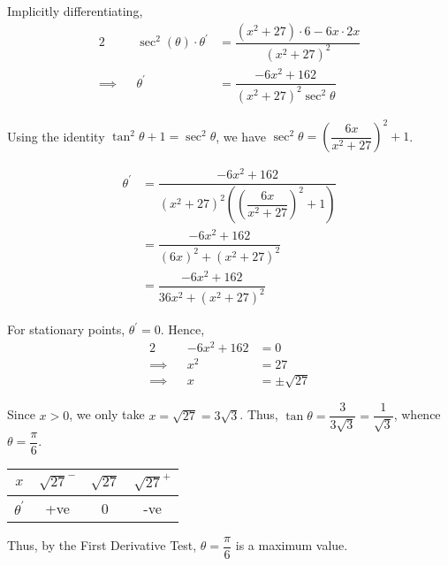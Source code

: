 \documentclass{echw}
\begin{document}
            Implicitly differentiating,
            \begin{alignat*}{2}
                &&\sec^2(\theta)\cdot\theta^\prime &= \dfrac{(x^2+27)\cdot 6 - 6x \cdot 2x}{(x^2+27)^2}\\
                \implies&&\theta^\prime&=\dfrac{-6x^2 + 162}{(x^2+27)^2\sec^2\theta}
            \end{alignat*}

            Using the identity $\tan^2 \theta + 1 = \sec^2\theta$, we have $\sec^2\theta = \left(\dfrac{6x}{x^2+27}\right)^2 + 1$.

            \begin{align*}
                \theta^\prime &= \dfrac{-6x^2 + 162}{(x^2+27)^2\left(\left(\dfrac{6x}{x^2+27}\right)^2 + 1\right)}\\
                &= \dfrac{-6x^2 + 162}{(6x)^2 + \left(x^2+27\right)^2}\\
                &= \dfrac{-6x^2 + 162}{36x^2 + \left(x^2+27\right)^2}
            \end{align*}

            For stationary points, $\theta^\prime = 0$. Hence,
            \begin{alignat*}{2}
                &&-6x^2 + 162 &= 0\\
                \implies&&x^2 &= 27\\
                \implies&&x &= \pm \sqrt{27}
            \end{alignat*}

            Since $x > 0$, we only take $x = \sqrt{27}=3\sqrt{3}$. Thus, $\tan\theta = \dfrac3{3\sqrt{3}} = \dfrac1{\sqrt3}$, whence $\theta = \dfrac{\pi}{6}$.


            \begin{table}[h]
                \centering
                \begin{tabular}{|c|c|c|c|}
                \hline
                $x$ & $\sqrt{27}^-$ & $\sqrt{27}$ & $\sqrt{27}^+$ \\\hline
                $\theta^\prime$ & +ve   & 0 & -ve   \\\hline
                \end{tabular}
            \end{table}

            Thus, by the First Derivative Test, $\theta = \dfrac{\pi}6$ is a maximum value.
\end{document}
